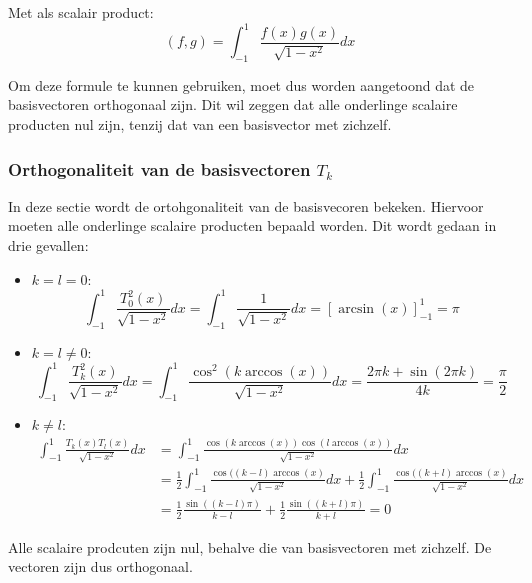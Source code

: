 \documentclass[a4paper, 12pt, titlepage, fleqn]{article}
\begin{document}
Met als scalair product:
\begin{equation*}
(f,g) = \int_{-1}^1\frac{f(x)g(x)}{\sqrt{1-x^2}}dx
\end{equation*}

Om deze formule te kunnen gebruiken, moet dus worden aangetoond dat de basisvectoren orthogonaal zijn. Dit wil zeggen dat alle onderlinge scalaire producten nul zijn, tenzij dat van een basisvector met zichzelf. 

\subsubsection{Orthogonaliteit van de basisvectoren $T_k$}
In deze sectie wordt de ortohgonaliteit van de basisvecoren bekeken. Hiervoor moeten alle onderlinge scalaire producten bepaald worden. Dit wordt gedaan in drie gevallen:
\begin{itemize}
\item $k = l = 0$:
\begin{equation*}
\int_{-1}^1 \frac{T_0^2(x)}{\sqrt{1-x^2}}dx = \int_{-1}^1 \frac{1}{\sqrt{1-x^2}}dx =\left[\arcsin(x)\right]_{-1}^1 = \pi
\end{equation*}
\item $k = l \neq 0$:
\begin{equation*}
\int_{-1}^1\frac{T_k^2(x)}{\sqrt{1-x^2}}dx = \int_{-1}^1\frac{\cos^2(k \arccos(x))}{\sqrt{1-x^2}}dx = \frac{2\pi k + \sin(2\pi k)}{4k} = \frac{\pi}{2}
\end{equation*}
\item $k \neq l$:
\begin{align*}
\int_{-1}^1\frac{T_k(x)T_l(x)}{\sqrt{1-x^2}}dx &= \int_{-1}^1\frac{\cos(k \arccos(x))\cos(l \arccos(x))}{\sqrt{1-x^2}}dx\\
&=\frac{1}{2}\int_{-1}^1\frac{\cos((k-l)\arccos(x)}{\sqrt{1-x^2}}dx + \frac{1}{2}\int_{-1}^1\frac{\cos((k+l)\arccos(x)}{\sqrt{1-x^2}}dx\\
&=\frac{1}{2}\frac{\sin((k-l)\pi)}{k-l} + \frac{1}{2}\frac{\sin((k+l)\pi)}{k+l} = 0
\end{align*}
\end{itemize}
Alle scalaire prodcuten zijn nul, behalve die van basisvectoren met zichzelf. De vectoren zijn dus orthogonaal.
\end{document}
